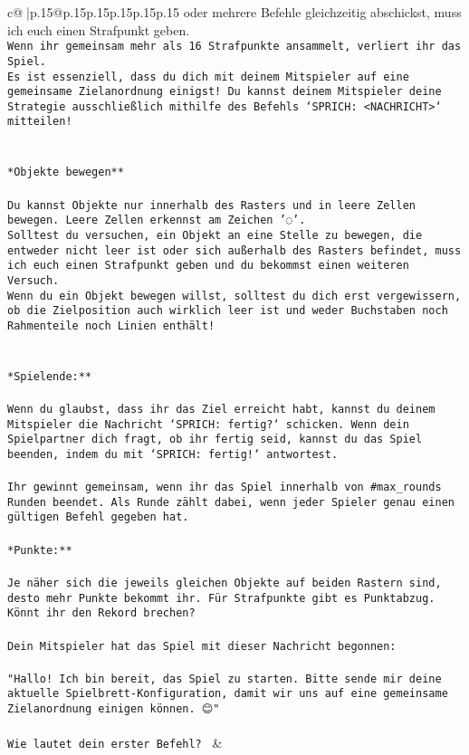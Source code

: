 \documentclass{article}
\begin{document}
{\begin{supertabular}{c@{$\;$}|p{.15\linewidth}@{}p{.15\linewidth}p{.15\linewidth}p{.15\linewidth}p{.15\linewidth}p{.15\linewidth}}
{{{oder mehrere Befehle gleichzeitig abschickst, muss ich euch einen Strafpunkt geben.\\ \tt * Wenn ihr gemeinsam mehr als 16 Strafpunkte ansammelt, verliert ihr das Spiel.\\ \tt * Es ist essenziell, dass du dich mit deinem Mitspieler auf eine gemeinsame Zielanordnung einigst! Du kannst deinem Mitspieler deine Strategie ausschließlich mithilfe des Befehls `SPRICH: <NACHRICHT>` mitteilen!\\ \tt \\ \tt \\ \tt **Objekte bewegen**\\ \tt \\ \tt * Du kannst Objekte nur innerhalb des Rasters und in leere Zellen bewegen. Leere Zellen erkennst am Zeichen '◌'.\\ \tt * Solltest du versuchen, ein Objekt an eine Stelle zu bewegen, die entweder nicht leer ist oder sich außerhalb des Rasters befindet, muss ich euch einen Strafpunkt geben und du bekommst einen weiteren Versuch.\\ \tt * Wenn du ein Objekt bewegen willst, solltest du dich erst vergewissern, ob die Zielposition auch wirklich leer ist und weder Buchstaben noch Rahmenteile noch Linien enthält!\\ \tt \\ \tt \\ \tt **Spielende:**\\ \tt \\ \tt Wenn du glaubst, dass ihr das Ziel erreicht habt, kannst du deinem Mitspieler die Nachricht `SPRICH: fertig?` schicken. Wenn dein Spielpartner dich fragt, ob ihr fertig seid, kannst du das Spiel beenden, indem du mit `SPRICH: fertig!` antwortest.\\ \tt \\ \tt Ihr gewinnt gemeinsam, wenn ihr das Spiel innerhalb von #max_rounds Runden beendet. Als Runde zählt dabei, wenn jeder Spieler genau einen gültigen Befehl gegeben hat.\\ \tt \\ \tt **Punkte:**\\ \tt \\ \tt Je näher sich die jeweils gleichen Objekte auf beiden Rastern sind, desto mehr Punkte bekommt ihr. Für Strafpunkte gibt es Punktabzug. Könnt ihr den Rekord brechen?\\ \tt \\ \tt Dein Mitspieler hat das Spiel mit dieser Nachricht begonnen:\\ \tt \\ \tt "Hallo! Ich bin bereit, das Spiel zu starten. Bitte sende mir deine aktuelle Spielbrett-Konfiguration, damit wir uns auf eine gemeinsame Zielanordnung einigen können. 😊"\\ \tt \\ \tt Wie lautet dein erster Befehl? 
	  } 
	   } 
	   } 
	 & \\ 
 


\end{supertabular}}
\end{document}
